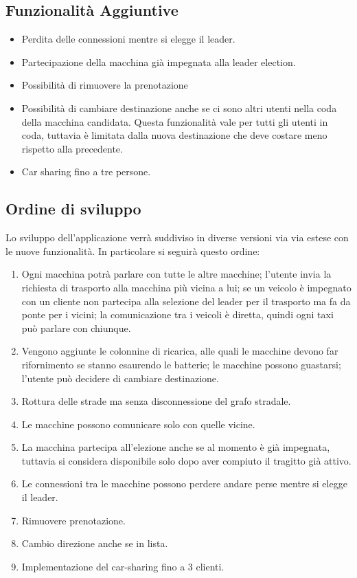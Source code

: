 \subsection{Funzionalità Aggiuntive}

\begin{itemize}
	\item Perdita delle connessioni mentre si elegge il leader.
	\item Partecipazione della macchina già impegnata alla leader election.
	\item Possibilità di rimuovere la prenotazione
	\item Possibilità di cambiare destinazione anche se ci sono altri utenti nella coda della macchina candidata. Questa funzionalità vale per tutti gli utenti in coda, tuttavia è limitata dalla nuova destinazione che deve costare meno rispetto alla precedente.
	\item Car sharing fino a tre persone.
\end{itemize}

\subsection{Ordine di sviluppo}
Lo sviluppo dell'applicazione verrà suddiviso in diverse versioni via via estese con le nuove funzionalità. In particolare si seguirà questo ordine:

\begin{enumerate}
	\item Ogni macchina potrà parlare con tutte le altre macchine; l'utente invia la richiesta di trasporto alla macchina più vicina a lui; se un veicolo è impegnato con un cliente non partecipa alla selezione del leader per il trasporto ma fa da ponte per i vicini; la comunicazione tra i veicoli è diretta, quindi ogni taxi può parlare con chiunque.
	\item Vengono aggiunte le colonnine di ricarica, alle quali le macchine devono far rifornimento se stanno esaurendo le batterie; le macchine possono guastarsi; l'utente può decidere di cambiare destinazione.
	\item Rottura delle strade ma senza disconnessione del grafo stradale.
	\item Le macchine possono comunicare solo con quelle vicine.
	\item La macchina partecipa all'elezione anche se al momento è già impegnata, tuttavia si considera disponibile solo dopo aver compiuto il tragitto già attivo.
	\item Le connessioni tra le macchine possono perdere andare perse mentre si elegge il leader.
	\item Rimuovere prenotazione.
	\item Cambio direzione anche se in lista.
	\item Implementazione del car-sharing fino a 3 clienti.
\end{enumerate}